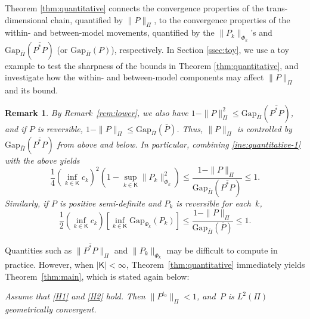\documentclass[12pt]{article}
\newtheorem{remark}[theorem]{Remark}
\begin{document}
{
Theorem \ref{thm:quantitative} connects the convergence properties of the trans-dimensional chain, quantified by $\|P\|_{\Pi}$, to the convergence properties of the within- and between-model movements, quantified by the $\|P_k\|_{\Phi_k}$'s and $\mbox{Gap}_{\bar{\Pi}}(\overline{P^*P})$ (or $\mbox{Gap}_{\bar{\Pi}}(P)$), respectively.
In Section \ref{ssec:toy}, we use a toy example to test the sharpness of the bounds in Theorem \ref{thm:quantitative}, and investigate how the within- and between-model components may affect $\|P\|_{\Pi}$ and its bound.

\begin{remark} \label{rem:lower-2}
	By Remark~\ref{rem:lower}, we also have $1 - \|P\|_{\Pi}^2 \leq \mbox{Gap}_{\bar{\Pi}}(\overline{P^*P})$, and if $P$ is reversible, $1 - \|P\|_{\Pi} \leq \mbox{Gap}_{\bar{\Pi}}(\bar{P})$.
	Thus, $\|P\|_{\Pi}$ is controlled by $\mbox{Gap}_{\bar{\Pi}}(\overline{P^*P})$ from above and below.
	In particular, combining \eqref{ine:quantitative-1} with the above yields
	\[
	\frac{1}{4} \left( \inf_{k \in \mathsf{K}} c_k \right)^2 \left( 1 - \sup_{k \in \mathsf{K}} \|P_k \|_{\Phi_k}^2 \right) \leq \frac{1 - \|P\|_{\Pi}}{\mbox{Gap}_{\bar{\Pi}}(\overline{P^*P})} \leq 1.
	\]
	Similarly, if $P$ is positive semi-definite and $P_k$ is reversible for each~$k$,
	\[
	\frac{1}{2} \left( \inf_{k \in \mathsf{K}} c_k \right) \left[ \inf_{k \in \mathsf{K}} \mbox{Gap}_{\Phi_k}(P_k) \right] \leq \frac{1 - \|P\|_{\Pi}}{\mbox{Gap}_{\bar{\Pi}}(\bar{P}) } \leq 1.
	\]
\end{remark}

}

Quantities such as $\|\overline{P^*P}\|_{\Pi}$ and $\|P_k\|_{\Phi_k}$ may be difficult to compute in practice.
However, when $|\mathsf{K}| < \infty$, Theorem~\ref{thm:quantitative} immediately yields Theorem~\ref{thm:main}, which is stated again below:

{\it
	Assume that \ref{H1} and \ref{H2} hold.
	Then $\|P^{t_0}\|_{\Pi} < 1$, and~$P$ is $L^2(\Pi)$ geometrically convergent.
}
\end{document}
